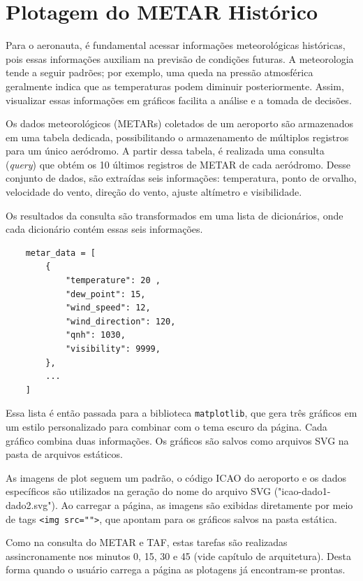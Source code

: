 \chapter{Plotagem do METAR Histórico}

Para o aeronauta, é fundamental acessar informações meteorológicas históricas, pois essas informações auxiliam 
na previsão de condições futuras. A meteorologia tende a seguir padrões; por exemplo, uma queda na pressão 
atmosférica geralmente indica que as temperaturas podem diminuir posteriormente. Assim, visualizar essas 
informações em gráficos facilita a análise e a tomada de decisões.

Os dados meteorológicos (METARs) coletados de um aeroporto são armazenados em uma tabela dedicada, possibilitando
o armazenamento de múltiplos registros para um único aeródromo. A partir dessa tabela, é realizada uma consulta 
(\textit{query}) que obtém os 10 últimos registros de METAR de cada aeródromo. Desse conjunto de dados, são extraídas 
seis informações: temperatura, ponto de orvalho, velocidade do vento, direção do vento, ajuste altímetro e visibilidade.

Os resultados da consulta são transformados em uma lista de dicionários, onde cada dicionário contém essas seis 
informações.

\begin{verbatim}
    metar_data = [
        {
            "temperature": 20 ,
            "dew_point": 15,
            "wind_speed": 12,
            "wind_direction": 120,
            "qnh": 1030,
            "visibility": 9999,
        },
        ...
    ]
\end{verbatim}


Essa lista é então passada para a biblioteca \texttt{matplotlib}, que gera três gráficos em um estilo 
personalizado para combinar com o tema escuro da página. Cada gráfico combina duas informações. 
Os gráficos são salvos como arquivos SVG na pasta de arquivos estáticos.

As imagens de plot seguem um padrão, o código ICAO do aeroporto e os dados específicos são utilizados na geração 
do nome do arquivo SVG ("icao-dado1-dado2.svg"). Ao carregar a página, as imagens 
são exibidas diretamente por meio de tags \texttt{<img src="">}, que apontam para os gráficos salvos na pasta estática.

Como na consulta do METAR e TAF, estas tarefas são realizadas assincronamente nos minutos 0, 15, 30 e 45 (vide capítulo
de arquitetura). Desta forma quando o usuário carrega a página as plotagens já encontram-se prontas.


